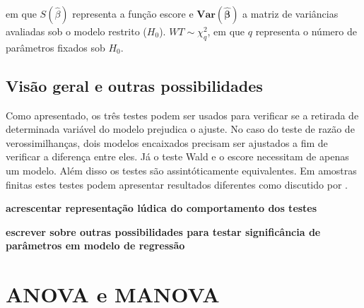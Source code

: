 em que $S(\hat\beta)$ representa a função escore e $\boldsymbol{Var(\hat\beta)}$ a matriz de variâncias avaliadas sob o modelo restrito ($H_0$). $WT \sim \chi^2_q$, em que $q$ representa o número de parâmetros fixados sob $H_0$.

\subsection{Visão geral e outras possibilidades}

Como apresentado, os três testes podem ser usados para verificar se a retirada de determinada variável do modelo prejudica o ajuste. No caso do teste de razão de verossimilhanças, dois modelos encaixados precisam ser ajustados a fim de verificar a diferença entre eles. Já o teste Wald e o escore necessitam de apenas um modelo. Além disso os testes são assintóticamente equivalentes. Em amostras finitas estes testes podem apresentar resultados diferentes como discutido por \citet{conflict}.

\textbf{acrescentar representação lúdica do comportamento dos testes}

\textbf{escrever sobre outras possibilidades para testar significância de parâmetros em modelo de regressão}

\section{ANOVA e MANOVA}
